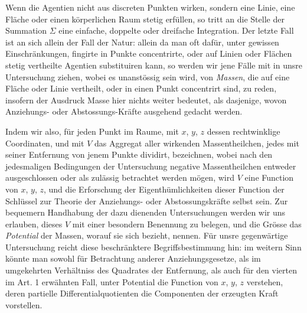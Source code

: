Wenn die Agentien nicht aus discreten Punkten wirken, sondern eine Linie, eine Fläche oder einen körperlichen Raum stetig erfüllen, so tritt an die Stelle der Summation $\Sigma$ eine einfache, doppelte oder dreifache Integration. Der letzte Fall ist an sich allein der Fall der Natur: allein da man oft dafür, unter gewissen Einschränkungen, fingirte in Punkte concentrirte, oder auf Linien oder Flächen stetig vertheilte Agentien substituiren kann, so werden wir jene Fälle mit in unsre Untersuchung ziehen, wobei es unanstössig sein wird, von \textit{Massen}, die auf eine Fläche oder Linie vertheilt, oder in einen Punkt concentrirt sind, zu reden, insofern der Ausdruck Masse hier nichts weiter bedeutet, als dasjenige, wovon Anziehungs- oder Abstossungs-Kräfte ausgehend gedacht werden.

Indem wir also, für jeden Punkt im Raume, mit $x$, $y$, $z$ dessen rechtwinklige Coordinaten, und mit $V$ das Aggregat aller wirkenden Massentheilchen, jedes mit seiner Entfernung von jenem Punkte dividirt, bezeichnen, wobei nach den jedesmaligen Bedingungen der Untersuchung negative Massentheilchen entweder ausgeschlossen oder als zulässig betrachtet werden mögen, wird $V$ eine Function von $x$, $y$, $z$, und die Erforschung der Eigenthümlichkeiten dieser Function der Schlüssel zur Theorie der Anziehungs- oder Abstossungskräfte selbst sein. Zur bequemern Handhabung der dazu dienenden Untersuchungen werden wir uns erlauben, dieses $V$ mit einer besondern Benennung zu belegen, und die Grösse das \textit{Potential} der Massen, worauf sie sich bezieht, nennen. Für unsre gegenwärtige Untersuchung reicht diese beschränktere Begriffsbestimmung hin: im weitern Sinn könnte man sowohl für Betrachtung anderer Anziehungsgesetze, als im umgekehrten Verhältniss des Quadrates der Entfernung, als auch für den vierten im Art. 1 erwähnten Fall, unter Potential die Function von $x$, $y$, $z$ verstehen, deren partielle Differentialquotienten die Componenten der erzeugten Kraft vorstellen.

